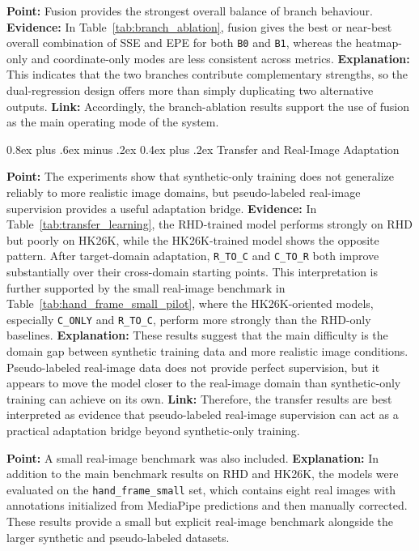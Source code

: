 \documentclass[10pt,letterpaper]{article}
\makeatletter
\renewcommand\subsubsection{\@startsection{subsubsection}{3}{\z@}%
  {0.8ex plus .6ex minus .2ex}%
  {0.4ex plus .2ex}%
  {\normalfont\small\itshape}}
\makeatother
\begin{document}
\medskip
\noindent\textbf{Point:} Fusion provides the strongest overall balance of branch behaviour.  
\textbf{Evidence:} In Table~\ref{tab:branch_ablation}, fusion gives the best or near-best overall combination of SSE and EPE for both \texttt{B0} and \texttt{B1}, whereas the heatmap-only and coordinate-only modes are less consistent across metrics.  
\textbf{Explanation:} This indicates that the two branches contribute complementary strengths, so the dual-regression design offers more than simply duplicating two alternative outputs.  
\textbf{Link:} Accordingly, the branch-ablation results support the use of fusion as the main operating mode of the system.

\subsubsection{Transfer and Real-Image Adaptation}

\medskip
\noindent\textbf{Point:} The experiments show that synthetic-only training does not generalize reliably to more realistic image domains, but pseudo-labeled real-image supervision provides a useful adaptation bridge.  
\textbf{Evidence:} In Table~\ref{tab:transfer_learning}, the RHD-trained model performs strongly on RHD but poorly on HK26K, while the HK26K-trained model shows the opposite pattern. After target-domain adaptation, \texttt{R\_TO\_C} and \texttt{C\_TO\_R} both improve substantially over their cross-domain starting points. This interpretation is further supported by the small real-image benchmark in Table~\ref{tab:hand_frame_small_pilot}, where the HK26K-oriented models, especially \texttt{C\_ONLY} and \texttt{R\_TO\_C}, perform more strongly than the RHD-only baselines.  
\textbf{Explanation:} These results suggest that the main difficulty is the domain gap between synthetic training data and more realistic image conditions. Pseudo-labeled real-image data does not provide perfect supervision, but it appears to move the model closer to the real-image domain than synthetic-only training can achieve on its own.  
\textbf{Link:} Therefore, the transfer results are best interpreted as evidence that pseudo-labeled real-image supervision can act as a practical adaptation bridge beyond synthetic-only training.

\medskip
\noindent\textbf{Point:} A small real-image benchmark was also included.  
\textbf{Explanation:} In addition to the main benchmark results on RHD and HK26K, the models were evaluated on the \texttt{hand\_frame\_small} set, which contains eight real images with annotations initialized from MediaPipe predictions and then manually corrected. These results provide a small but explicit real-image benchmark alongside the larger synthetic and pseudo-labeled datasets.
\end{document}
